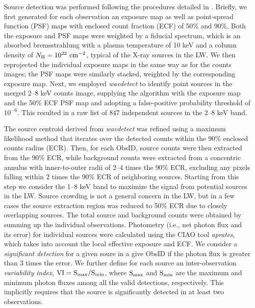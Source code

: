 \documentclass[twoside,twocolumn]{aastex63}
\begin{document}
Source detection was performed following the procedures detailed in \citet{2018ApJS..235...26Z}.
Briefly, we first generated for each observation an exposure map as well as point-spread function (PSF) maps with enclosed count fraction (ECF) of 50\% and 90\%. 
Both the exposure and PSF maps were weighted by a fiducial spectrum, which is an absorbed bremsstrahlung with a plasma temperature of 10 keV and a column density of $N_{\rm H}=10^{22}{\rm~cm^{-2}}$, typical of the X-ray sources in the LW. 
We then reprojected the individual exposure maps in the same way as for the counts images; the PSF maps were similarly stacked, weighted by the corresponding exposure map. 
Next, we employed {\it wavdetect} to identify point sources in the merged 2--8 keV counts image, supplying the algorithm  with the exposure map and the 50\% ECF PSF map and adopting a false-positive probability threshold of $10^{-6}$. 
This resulted in a raw list of 847 independent sources in the 2--8 keV band. 

The source centroid derived from {\it wavdetect} was refined using a maximum likelihood method that iterates over the detected counts within the 90\% enclosed counts radius (ECR).
Then, for each ObsID, source counts were then extracted from the 90\% ECR, while background counts were extracted from a concentric annulus with inner-to-outer radii of 2--4 times the 90\% ECR, excluding any pixels falling within 2 times the 90\% ECR of neighboring sources.
Starting from this step we consider the 1--8 keV band to maximize the signal from potential sources in the LW. 
Source crowding is not a general concern in the LW, but in a few cases the source extraction region was reduced to 50\% ECR due to closely overlapping sources. 
The total source and background counts were obtained by summing up the individual observations. 
Photometry (i.e., net photon flux and its error) for individual sources were calculated using the CIAO tool \emph{aprates}, which takes into account the local effective exposure and ECF. 
We consider a {\it significant detection} for a given soure in a give ObsID if the photon flux is greater than 3 times the error. 
We further define for each source an inter-observation {\it variability index}, $\rm VI=S_{max}/S_{min}$, where $\rm S_{max}$ and $\rm S_{min}$ are the maximum and minimum photon fluxes among all the valid detections, respectively. This implicitly requires that the source is significantly detected in at least two observations.
\\
\end{document}

